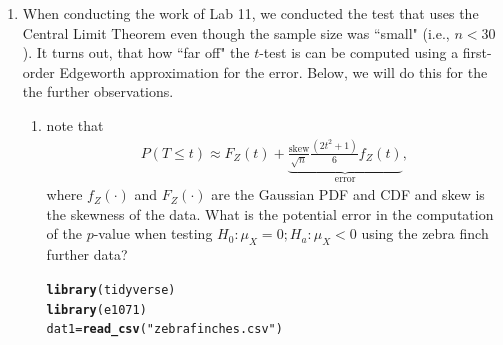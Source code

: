 \documentclass{article}\usepackage[]{graphicx}\usepackage[]{xcolor}
\makeatletter
\newcommand{\hlsng}[1]{\textcolor[rgb]{0.192,0.494,0.8}{#1}}%
\newcommand{\hldef}[1]{\textcolor[rgb]{0.345,0.345,0.345}{#1}}%
\newcommand{\hlkwb}[1]{\textcolor[rgb]{0.69,0.353,0.396}{#1}}%
\newcommand{\hlkwd}[1]{\textcolor[rgb]{0.737,0.353,0.396}{\textbf{#1}}}%
\newenvironment{kframe}{%
 \def\at@end@of@kframe{}%
 \ifinner\ifhmode%
  \def\at@end@of@kframe{\end{minipage}}%
  \begin{minipage}{\columnwidth}%
 \fi\fi%
 \def\FrameCommand##1{\hskip\@totalleftmargin \hskip-\fboxsep
 \colorbox{shadecolor}{##1}\hskip-\fboxsep
     \hskip-\linewidth \hskip-\@totalleftmargin \hskip\columnwidth}%
 \MakeFramed {\advance\hsize-\width
   \@totalleftmargin\z@ \linewidth\hsize
   \@setminipage}}%
 {\par\unskip\endMakeFramed%
 \at@end@of@kframe}
\newenvironment{knitrout}{}{} %
\makeatother
\begin{document}
\begin{enumerate}
\item When conducting the work of Lab 11, we conducted the test that uses the
Central Limit Theorem even though the sample size was ``small" (i.e., $n<30$).
It turns out, that how ``far off" the $t$-test is can be computed using
a first-order Edgeworth approximation for the error. Below, we will do this 
for the the further observations.
\begin{enumerate}
  \item \cite{Boos00} note that 
  \begin{align*}
    P(T \leq t) \approx F_Z(t) + \underbrace{\frac{\text{skew}}{\sqrt{n}} \frac{(2t^2+1)}{6} f_Z(t)}_{\textrm{error}},
  \end{align*}
  where $f_Z(\cdot)$ and $F_Z(\cdot)$ are the Gaussian PDF and CDF and skew is the
  skewness of the data. What is the potential error in the computation of the 
  $p$-value when testing $H_0: \mu_X=0; H_a: \mu_X<0$ using the zebra finch further data? 
\begin{knitrout}\scriptsize
{}\color{fgcolor}\begin{kframe}
\begin{alltt}
\hlkwd{library}\hldef{(tidyverse)}
\hlkwd{library}\hldef{(e1071)}
\hldef{dat1} \hlkwb{=} \hlkwd{read_csv}\hldef{(}\hlsng{"zebrafinches.csv"}\hldef{)}
\end{alltt}



\end{kframe}
\end{knitrout}
\end{enumerate}
\end{enumerate}
\end{document}

